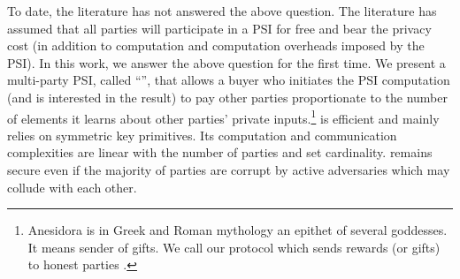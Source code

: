 To date, the literature has not answered the above question. The literature has assumed that all parties will participate in a PSI for free and bear the privacy cost (in addition to computation and computation overheads imposed by the PSI).  %
%
In this work, we answer the above question for the first time. We present a multi-party PSI, called ``\withRew'', that allows a buyer who initiates the PSI computation (and is interested in the result) to pay other parties proportionate to the number of elements it learns about other parties' private inputs.\footnote{Anesidora is in Greek and Roman mythology an epithet of several goddesses. It means sender of gifts. We call our protocol which sends rewards (or gifts) to honest parties \withRew.}  \withRew is efficient and mainly relies on symmetric key primitives.  Its computation and communication complexities are linear with the number of parties and set cardinality. \withRew remains secure even if the majority of parties are corrupt by active adversaries which may collude with each other. 













